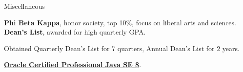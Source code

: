 \begin{rubric}{Miscellaneous}

\entry*[2018] \textbf{Phi Beta Kappa}, honor society, top 10\%, focus on liberal arts and sciences.
\entry*[2016-2018] \textbf{Dean's List}, awarded for high quarterly GPA.
\par Obtained Quarterly Dean's List for 7 quarters, Annual Dean's List for 2 years.

\entry*[2018] \textbf{\href{https://www.youracclaim.com/badges/c3d44a4e-fabc-4abb-b4fd-2079a364f6bd/public_url}{Oracle Certified Professional Java SE 8}}.

\end{rubric}